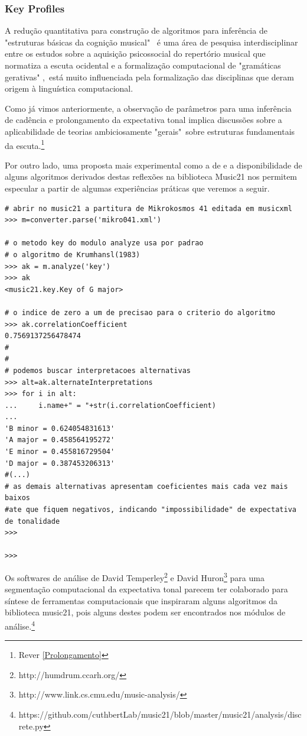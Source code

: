 \documentclass[
	12pt,				%
	openright,			%
	twoside,			%
	a4paper,			%
	english,			%
	french,				%
	spanish,			%
	brazil				%
	]{abntex2}
\begin{document}
\subsubsection{Key Profiles} 

A redução quantitativa para construção de algoritmos para inferência de "estruturas básicas da cognição musical" \cite{temperley2001cognition}\ é uma área de pesquisa interdisciplinar entre os estudos sobre a aquisição psicossocial do repertório musical que normatiza a escuta ocidental e a formalização computacional de "gramáticas gerativas" \cite[p. 83]{nierhaus2009algorithmic},\ está muito influenciada pela formalização das disciplinas que deram origem à linguística computacional.\cite{roads1979grammars}    

Como já vimos anteriormente, a observação de parâmetros para uma inferência de cadência e prolongamento da expectativa tonal implica discussões sobre a aplicabilidade de teorias ambiciosamente "gerais"\ sobre estruturas fundamentais da escuta.\footnote{Rever \autoref{Prolongamento}  }

Por outro lado, uma proposta mais experimental como a de  e a disponibilidade de alguns algoritmos derivados destas reflexões na biblioteca Music21 nos permitem especular a partir de algumas experiências práticas que veremos a seguir.


\begin{lstlisting}
# abrir no music21 a partitura de Mikrokosmos 41 editada em musicxml
>>> m=converter.parse('mikro041.xml')

# o metodo key do modulo analyze usa por padrao
# o algoritmo de Krumhansl(1983)
>>> ak = m.analyze('key')
>>> ak
<music21.key.Key of G major>

# o indice de zero a um de precisao para o criterio do algoritmo
>>> ak.correlationCoefficient
0.7569137256478474
#
#
# podemos buscar interpretacoes alternativas
>>> alt=ak.alternateInterpretations
>>> for i in alt:
...     i.name+" = "+str(i.correlationCoefficient)
... 
'B minor = 0.624054831613'
'A major = 0.458564195272'
'E minor = 0.455816729504'
'D major = 0.387453206313'
#(...)
# as demais alternativas apresentam coeficientes mais cada vez mais baixos 
#ate que fiquem negativos, indicando "impossibilidade" de expectativa de tonalidade
>>> 

>>> 
\end{lstlisting}

Os softwares de análise de David Temperley\footnote{http://humdrum.ccarh.org/} e David Huron\footnote{http://www.link.cs.cmu.edu/music-analysis/}  para uma segmentação computacional da expectativa tonal parecem ter colaborado para síntese de ferramentas computacionais que inspiraram alguns algoritmos da biblioteca music21, pois alguns destes podem ser encontrados nos módulos de análise.\footnote{https://github.com/cuthbertLab/music21/blob/master/music21/analysis/discrete.py}
\end{document}
